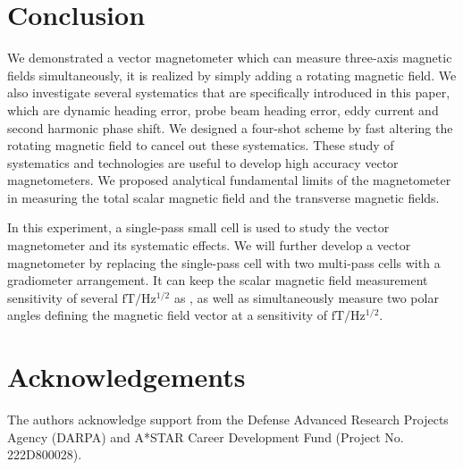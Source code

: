 \documentclass[prx,twocolumn,10pt,nofootinbib]{revtex4-1}
\begin{document}
\section{Conclusion}
We demonstrated a vector magnetometer which can measure three-axis magnetic fields simultaneously, it is realized by simply adding a rotating magnetic field. We also investigate several systematics that are specifically introduced in this paper, which are dynamic heading error, probe beam heading error, eddy current and second harmonic phase shift. We designed a four-shot scheme by fast altering the rotating magnetic field to cancel out these systematics. These study of systematics and technologies are useful to develop high accuracy vector magnetometers. We proposed analytical fundamental limits of the magnetometer in measuring the total scalar magnetic field and the transverse magnetic fields.

In this experiment, a single-pass small cell is used to study the vector magnetometer and its systematic effects. We will further develop a vector magnetometer by replacing the single-pass cell with two multi-pass cells with a gradiometer arrangement. It can keep the scalar magnetic field measurement sensitivity of several $\mathrm{fT/Hz^{1/2}}$ as  \cite{limes2020portable}, as well as simultaneously measure two polar angles defining the magnetic field vector at a sensitivity of $\mathrm{fT/Hz^{1/2}}$.

\section*{Acknowledgements}
The authors acknowledge support from the Defense Advanced Research Projects Agency (DARPA) and A*STAR Career Development Fund (Project No. 222D800028).


%


\end{document}
